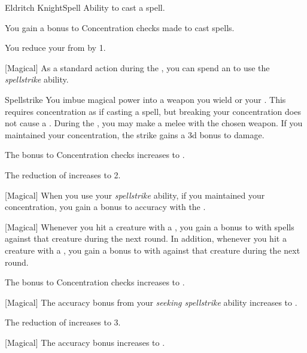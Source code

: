    \begin{feat}{Eldritch Knight}{Spell}
        \featpre Ability to cast a spell.

         You gain a  bonus to Concentration checks made to cast spells.

         You reduce your  from  by 1.

        [Magical] As a standard action during the , you can spend an  to use the \textit{spellstrike} ability.
        \begin{ability}{Spellstrike}
            You imbue magical power into a weapon you wield or your .
            This requires concentration as if casting a spell, but breaking your concentration does not cause a .
            During the , you may make a melee  with the chosen weapon.
            If you maintained your concentration, the strike gains a \plus3d bonus to damage.
        \end{ability}

         The bonus to Concentration checks increases to .

         The reduction of  increases to 2.

        [Magical] When you use your \textit{spellstrike} ability, if you maintained your concentration, you gain a  bonus to accuracy with the .

        [Magical] Whenever you hit a creature with a , you gain a  bonus to  with spells against that creature during the next round.
        In addition, whenever you hit a creature with a , you gain a  bonus to  with  against that creature during the next round.

         The bonus to Concentration checks increases to .

        [Magical] The accuracy bonus from your \textit{seeking spellstrike} ability increases to .

         The reduction of  increases to 3.

        [Magical] The accuracy bonus increases to .
    \end{feat}

